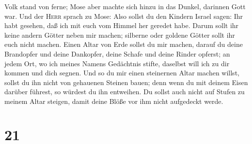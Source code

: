 Volk stand von ferne; Mose aber machte sich hinzu in das Dunkel,
darinnen Gott war.  Und der \textsc{Herr} sprach zu Mose:
Also sollst du den Kindern Israel sagen: Ihr habt gesehen, daß ich mit
euch vom Himmel her geredet habe.  Darum sollt ihr keine
andern Götter neben mir machen; silberne oder goldene Götter sollt ihr
euch nicht machen.  Einen Altar von Erde sollst du mir
machen, darauf du deine Brandopfer und deine Dankopfer, deine Schafe und
deine Rinder opferst; an jedem Ort, wo ich meines Namens Gedächtnis
stifte, daselbst will ich zu dir kommen und dich segnen. 
Und so du mir einen steinernen Altar machen willst, sollst du ihn nicht
von gehauenen Steinen bauen; denn wenn du mit deinem Eisen darüber
führest, so würdest du ihn entweihen.  Du sollst auch
nicht auf Stufen zu meinem Altar steigen, damit deine Blöße vor ihm
nicht aufgedeckt werde.

\hypertarget{section-20}{%
\section{21}\label{section-20}}

